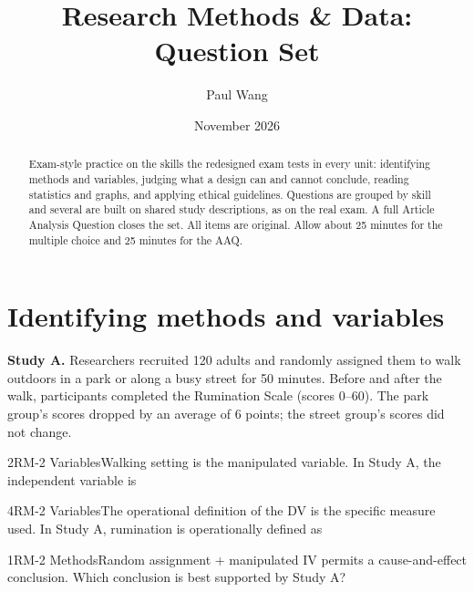 \documentclass[11pt]{article}
\title{Research Methods \& Data: Question Set}
\author{Paul Wang}
\date{November 2026}
\begin{document}
\maketitle

\begin{abstract}
Exam-style practice on the skills the redesigned exam tests in every unit: identifying methods and variables, judging what a design can and cannot conclude, reading statistics and graphs, and applying ethical guidelines. Questions are grouped by skill and several are built on shared study descriptions, as on the real exam. A full Article Analysis Question closes the set. All items are original. Allow about 25 minutes for the multiple choice and 25 minutes for the AAQ.
\end{abstract}


\section{Identifying methods and variables}

\begin{stimulus}
\textbf{Study A.} Researchers recruited 120 adults and randomly assigned them to walk outdoors in a park or along a busy street for 50 minutes. Before and after the walk, participants completed the Rumination Scale (scores 0--60). The park group's scores dropped by an average of 6 points; the street group's scores did not change.
\end{stimulus}

\begin{q}{2}{RM-2 Variables}{Walking setting is the manipulated variable.}
In Study A, the independent variable is
\end{q}

\begin{q}{4}{RM-2 Variables}{The operational definition of the DV is the specific measure used.}
In Study A, rumination is operationally defined as
\end{q}

\begin{q}{1}{RM-2 Methods}{Random assignment + manipulated IV permits a cause-and-effect conclusion.}
Which conclusion is best supported by Study A?
\end{q}
\end{document}
